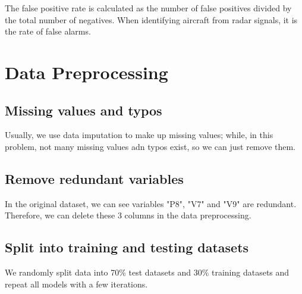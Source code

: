 \documentclass[11pt]{article}
\begin{document}
The false positive rate is calculated as the number of false positives divided by the total number of negatives. When identifying aircraft from radar signals, it is the rate of false alarms.


\section{Data Preprocessing}
\subsection{Missing values and typos}
Usually, we use data imputation to make up missing values; while, in this problem, not many missing values adn typos exist, so we can just remove them. 

\subsection{Remove redundant variables}
In the original dataset, we can see variables "P8", "V7" and "V9" are redundant. Therefore, we can delete these 3 columns in the data preprocessing.

\subsection{Split into training and testing datasets}
We randomly split data into 70\% test datasets and 30\% training datasets and repeat all models with a few iterations.
\end{document}
